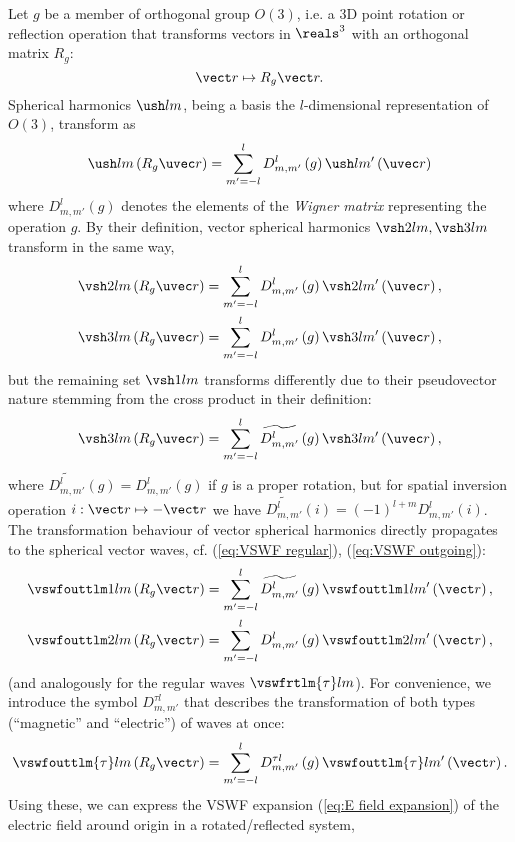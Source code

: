 Let $g$ be a member of orthogonal group $O(3)$, i.e. a 3D point
rotation or reflection operation that transforms vectors in $\reals^{3}$
with an orthogonal matrix $R_{g}$:
\[
\vect r\mapsto R_{g}\vect r.
\]
Spherical harmonics $\ush lm$, being a basis the $l$-dimensional
representation of $O(3)$, transform as \cite[???]{dresselhaus_group_2008}
\[
\ush lm\left(R_{g}\uvec r\right)=\sum_{m'=-l}^{l}D_{m,m'}^{l}\left(g\right)\ush l{m'}\left(\uvec r\right)
\]
where $D_{m,m'}^{l}\left(g\right)$ denotes the elements of the \emph{Wigner
matrix} representing the operation $g$. By their definition, vector
spherical harmonics $\vsh 2lm,\vsh 3lm$ transform in the same way,
\begin{align*}
\vsh 2lm\left(R_{g}\uvec r\right) & =\sum_{m'=-l}^{l}D_{m,m'}^{l}\left(g\right)\vsh 2l{m'}\left(\uvec r\right),\\
\vsh 3lm\left(R_{g}\uvec r\right) & =\sum_{m'=-l}^{l}D_{m,m'}^{l}\left(g\right)\vsh 3l{m'}\left(\uvec r\right),
\end{align*}
but the remaining set $\vsh 1lm$ transforms differently due to their
pseudovector nature stemming from the cross product in their definition:
\[
\vsh 3lm\left(R_{g}\uvec r\right)=\sum_{m'=-l}^{l}\widetilde{D_{m,m'}^{l}}\left(g\right)\vsh 3l{m'}\left(\uvec r\right),
\]
where $\widetilde{D_{m,m'}^{l}}\left(g\right)=D_{m,m'}^{l}\left(g\right)$
if $g$ is a proper rotation, but for spatial inversion operation
$i:\vect r\mapsto-\vect r$ we have $\widetilde{D_{m,m'}^{l}}\left(i\right)=\left(-1\right)^{l+m}D_{m,m'}^{l}\left(i\right)$.
The transformation behaviour of vector spherical harmonics directly
propagates to the spherical vector waves, cf. (\ref{eq:VSWF regular}),
(\ref{eq:VSWF outgoing}):
\begin{align*}
\vswfouttlm 1lm\left(R_{g}\vect r\right) & =\sum_{m'=-l}^{l}\widetilde{D_{m,m'}^{l}}\left(g\right)\vswfouttlm 1l{m'}\left(\vect r\right),\\
\vswfouttlm 2lm\left(R_{g}\vect r\right) & =\sum_{m'=-l}^{l}D_{m,m'}^{l}\left(g\right)\vswfouttlm 2l{m'}\left(\vect r\right),
\end{align*}
(and analogously for the regular waves $\vswfrtlm{\tau}lm$).  For
convenience, we introduce the symbol $D_{m,m'}^{\tau l}$ that describes
the transformation of both types (``magnetic'' and ``electric'')
of waves at once:
\[
\vswfouttlm{\tau}lm\left(R_{g}\vect r\right)=\sum_{m'=-l}^{l}D_{m,m'}^{\tau l}\left(g\right)\vswfouttlm{\tau}l{m'}\left(\vect r\right).
\]
Using these, we can express the VSWF expansion (\ref{eq:E field expansion})
of the electric field around origin in a rotated/reflected system,
